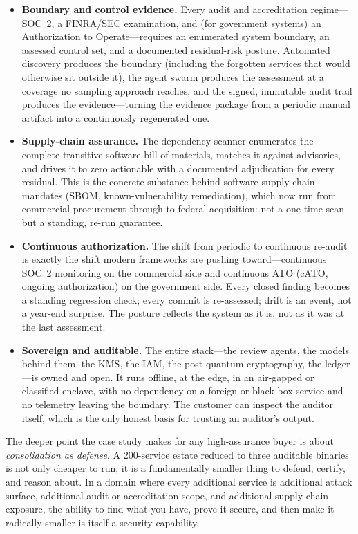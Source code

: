 \documentclass[11pt,letterpaper]{article}
\begin{document}
\begin{itemize}
  \item \textbf{Boundary and control evidence.} Every audit and accreditation
  regime---SOC~2, a FINRA/SEC examination, and (for government systems) an
  Authorization to Operate---requires an enumerated
  system boundary, an assessed control set, and a documented residual-risk
  posture. Automated discovery produces the boundary (including the forgotten
  services that would otherwise sit outside it), the agent swarm produces the
  assessment at a coverage no sampling approach reaches, and the signed,
  immutable audit trail produces the evidence---turning the evidence package
  from a periodic manual artifact into a continuously regenerated one.
  \item \textbf{Supply-chain assurance.} The dependency scanner enumerates the
  complete transitive software bill of materials, matches it against advisories,
  and drives it to zero actionable with a documented adjudication for every
  residual. This is the concrete substance behind software-supply-chain mandates
  (SBOM, known-vulnerability remediation), which now run from commercial
  procurement through to federal acquisition: not a one-time scan but a standing,
  re-run guarantee.
  \item \textbf{Continuous authorization.} The shift from periodic to continuous
  re-audit is exactly the shift modern frameworks are pushing toward---continuous
  SOC~2 monitoring on the commercial side and continuous ATO (cATO, ongoing
  authorization) on the government side. Every closed finding becomes a standing
  regression check;
  every commit is re-assessed; drift is an event, not a year-end surprise. The
  posture reflects the system as it is, not as it was at the last
  assessment.
  \item \textbf{Sovereign and auditable.} The entire stack---the review agents,
  the models behind them, the KMS, the IAM, the post-quantum cryptography, the
  ledger---is owned and open. It runs offline, at the edge, in an air-gapped or
  classified enclave, with no dependency on a foreign or black-box service and no
  telemetry leaving the boundary. The customer can inspect the auditor itself,
  which is the only honest basis for trusting an auditor's output.
\end{itemize}

The deeper point the case study makes for any high-assurance buyer is about
\emph{consolidation as defense}. A 200-service estate reduced to three auditable
binaries is not only cheaper to run; it is a fundamentally smaller thing to
defend, certify, and reason about. In a domain where every additional service is
additional attack surface, additional audit or accreditation scope, and additional
supply-chain exposure, the ability to find what you have, prove it secure, and
then make it radically smaller is itself a security capability.
\end{document}

